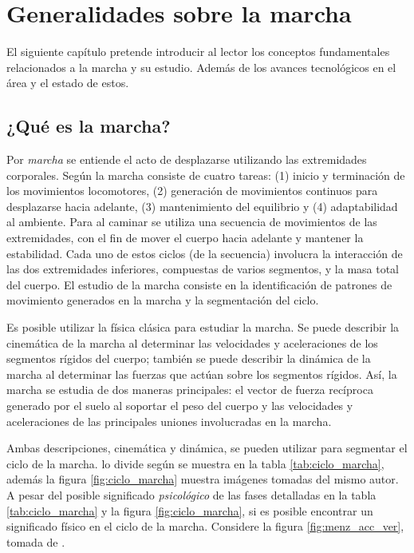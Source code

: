 \chapter[Generalidades]{Generalidades sobre la marcha}

El siguiente capítulo pretende introducir al lector los conceptos fundamentales relacionados a la marcha y su estudio. Además de los avances tecnológicos en el área y el estado de estos.

\section{¿Qué es la marcha?}

Por \emph{marcha} se entiende el acto de desplazarse utilizando las extremidades corporales. Según \cite{menz} la marcha consiste de cuatro tareas: (1) inicio y terminación de los movimientos locomotores, (2) generación de movimientos continuos para desplazarse hacia adelante, (3) mantenimiento del equilibrio y (4) adaptabilidad al ambiente. Para \cite{perry} al caminar se utiliza una secuencia de movimientos de las extremidades, con el fin de mover el cuerpo hacia adelante y mantener la estabilidad. Cada uno de estos ciclos (de la secuencia) involucra la interacción de las dos extremidades inferiores, compuestas de varios segmentos, y la masa total del cuerpo. El estudio de la marcha consiste en la identificación de patrones de movimiento generados en la marcha y la segmentación del ciclo.

Es posible utilizar la física clásica para estudiar la marcha. Se puede describir la cinemática de la marcha al determinar las velocidades y aceleraciones de los segmentos rígidos del cuerpo; también se puede describir la dinámica de la marcha al determinar las fuerzas que actúan sobre los segmentos rígidos. Así, la marcha se estudia de dos maneras principales: el vector de fuerza recíproca generado por el suelo al soportar el peso del cuerpo y las velocidades y aceleraciones de las principales uniones involucradas en la marcha. \citep{perry}

Ambas descripciones, cinemática y dinámica, se pueden utilizar para segmentar el ciclo de la marcha. \cite{perry} lo divide según se muestra en la tabla \ref{tab:ciclo_marcha}, además la figura \ref{fig:ciclo_marcha} muestra imágenes tomadas del mismo autor. A pesar del posible significado \emph{psicológico} de las fases detalladas en la tabla \ref{tab:ciclo_marcha} y la figura \ref{fig:ciclo_marcha}, si es posible encontrar un significado físico en el ciclo de la marcha. Considere la figura \ref{fig:menz_acc_ver}, tomada de \citep{menz}.


